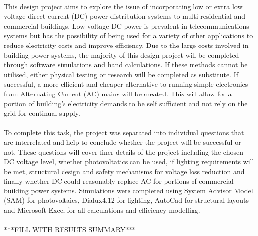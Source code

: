 \paragraph{}
This design project aims to explore the issue of incorporating low or extra low voltage direct current (DC) power distribution systems to multi-residential and commercial buildings. Low voltage DC power is prevalent in telecommunications systems but has the possibility of being used for a variety of other applications to reduce electricity costs and improve efficiency. Due to the large costs involved in building power systems, the majority of this design project will be completed through software simulations and hand calculations. If these methods cannot be utilised, either physical testing or research will be completed as substitute. If successful, a more efficient and cheaper alternative to running simple electronics from Alternating Current (AC) mains will be created. This will allow for a portion of building's electricity demands to be self sufficient and not rely on the grid for continual supply. 

\paragraph{}
To complete this task, the project was separated into individual questions that are interrelated and help to conclude whether the project will be successful or not. These questions will cover finer details of the project including the chosen DC voltage level, whether photovoltatics can be used, if lighting requirements will be met, structural design and safety mechanisms for voltage loss reduction and finally whether DC could reasonably replace AC for portions of commercial building power systems. Simulations were completed using System Advisor Model (SAM) for photovoltaics, Dialux4.12 for lighting, AutoCad for structural layouts and Microsoft Excel for all calculations and efficiency modelling.  

\paragraph{}
***FILL WITH RESULTS SUMMARY***
 
\newpage
